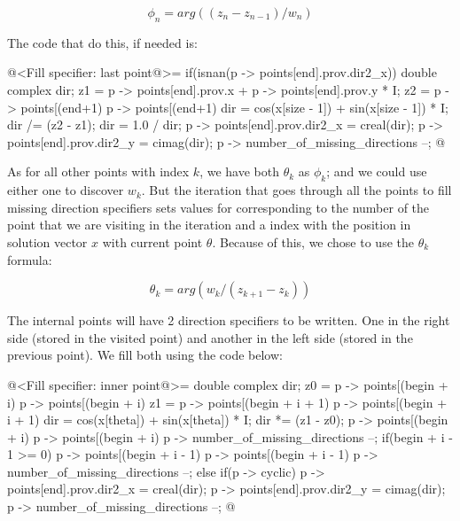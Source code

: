 $$
\phi_n = arg((z_n-z_{n-1})/w_n)
$$

The code that do this, if needed is:

\iniciocodigo
@<Fill specifier: last point@>=
if(isnan(p -> points[end].prov.dir2_x)){
  double complex dir;
  z1 = p -> points[end].prov.x + p -> points[end].prov.y * I;
  z2 = p -> points[(end+1) %
       p -> points[(end+1) %
  dir = cos(x[size - 1]) + sin(x[size - 1]) * I;
  dir /= (z2 - z1);
  dir = 1.0 / dir;
  p -> points[end].prov.dir2_x = creal(dir);
  p -> points[end].prov.dir2_y = cimag(dir);
  p -> number_of_missing_directions --;
}
@
\fimcodigo

As for all other points with index $k$, we have both $\theta_k$ as
$\phi_k$; and we could use either one to discover $w_k$. But the
iteration that goes through all the points to fill missing direction
specifiers sets values for  corresponding to the number
of the point that we are visiting in the iteration and
a  index with the position in solution vector $x$
with current point $\theta$. Because of this, we chose to use the
$\theta_k$ formula:

$$
\theta_k = arg(w_k/(z_{k+1}-z_k))
$$

The internal points will have 2 direction specifiers to be
written. One in the right side (stored in the visited point) and
another in the left side (stored in the previous point). We fill both
using the code below:

\iniciocodigo
@<Fill specifier: inner point@>=
{
  double complex dir;
  z0 = p -> points[(begin + i) %
       p -> points[(begin + i) %
  z1 = p -> points[(begin + i + 1) %
       p -> points[(begin + i + 1) %
  dir = cos(x[theta]) + sin(x[theta]) * I;
  dir *= (z1 - z0);
  p -> points[(begin + i) %
  p -> points[(begin + i) %
  p -> number_of_missing_directions --;
  if(begin + i - 1 >= 0){
    p -> points[(begin + i - 1) %
    p -> points[(begin + i - 1) %
    p -> number_of_missing_directions --;
  }
  else if(p -> cyclic){
    p -> points[end].prov.dir2_x = creal(dir);
    p -> points[end].prov.dir2_y = cimag(dir);
    p -> number_of_missing_directions --;
  }
}
@
\fimcodigo


